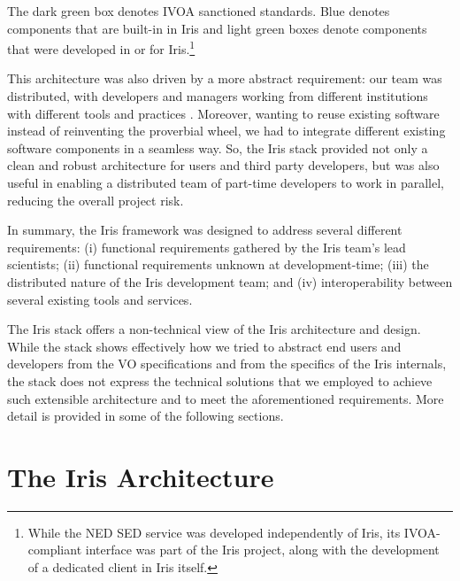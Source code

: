 \documentclass[preprint,authoryear,5p]{elsarticle}
\begin{document}
The dark green box denotes IVOA sanctioned standards. Blue denotes components
that are built-in in Iris and light green boxes denote components that were developed
in or for Iris.\footnote{While the NED SED service was developed independently of Iris,
its IVOA-compliant interface was part of the Iris project, along with the development of a
dedicated client in Iris itself.}

This architecture was also driven by a more abstract requirement:
our team was
distributed, with developers and managers working from different
institutions with different tools and practices \citep{2012SPIE.8449E..0IE}.
Moreover, wanting to reuse existing software instead of reinventing the
proverbial wheel, we had to integrate different existing software components in
a seamless way. So, the Iris stack provided not only a clean and robust architecture
for users and third party developers, but was also useful in enabling a distributed
team of part-time developers to work in parallel, reducing the overall project risk.

In summary, the Iris framework was designed to address several different
requirements: (i) functional requirements gathered by the Iris team's lead
scientists; (ii) functional requirements unknown at development-time; (iii) the
distributed nature of the Iris development team; and (iv) interoperability between 
several existing tools and services.

The Iris stack offers a non-technical view of the Iris architecture and design.
While the stack shows effectively how we tried to abstract end users and developers
from the VO specifications and from the specifics of the Iris internals, the stack does
not express the technical solutions that we employed to achieve such extensible
architecture and to meet the aforementioned requirements. More detail is
provided in some of the following sections.

\section{The Iris Architecture} \label{sec:architecture}
\end{document}
